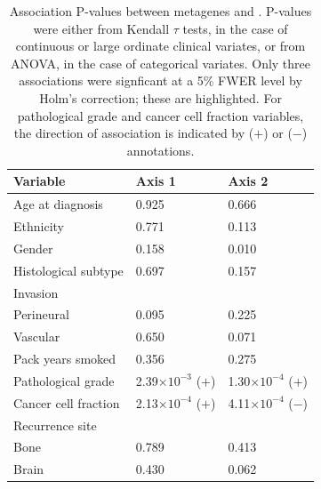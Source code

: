\documentclass[dissertation.tex]{subfiles}
\begin{document}
\begin{table}
\centering
\caption[Association P-values between metagenes and \texorpdfstring{}{CPVs}]{Association P-values between metagenes and .  P-values were either from Kendall $\tau$ tests, in the case of continuous or large ordinate clinical variates, or from ANOVA, in the case of categorical variates.  Only three associations were signficant at a 5\% FWER level by Holm's correction; these are highlighted.  For pathological grade and cancer cell fraction variables, the direction of association is indicated by ($+$) or ($-$) annotations.}\label{tab:sigs-mg-cpvs}
\begin{tabular}{@{}lll@{}}
Variable                   & Axis 1                        & Axis 2                        \\ \midrule
Age at diagnosis           & 0.925                         & 0.666                         \\
Ethnicity                  & 0.771                         & 0.113                         \\
Gender                     & 0.158                         & 0.010                         \\
Histological subtype       & 0.697                         & 0.157                         \\
Invasion                   &                               &                               \\
\quad Perineural           & 0.095                         & 0.225                         \\
\quad Vascular             & 0.650                         & 0.071                         \\
Pack years smoked          & 0.356                         & 0.275                         \\
Pathological grade         & 2.39$\times 10^{-3}$ ($+$)          & \cellcolor[HTML]{C0C0C0}1.30$\times 10^{-4}$ ($+$) \\
Cancer cell fraction       & \cellcolor[HTML]{C0C0C0}2.13$\times 10^{-4}$ ($+$) & \cellcolor[HTML]{C0C0C0}4.11$\times 10^{-4}$ ($-$) \\
Recurrence site            &                               &                               \\
\quad Bone                 & 0.789                         & 0.413                         \\
\quad Brain                & 0.430                         & 0.062                         \\

\end{tabular}
\end{table}
\end{document}
